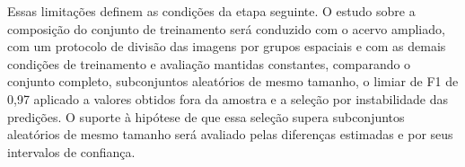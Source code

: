 Essas limita\c{c}\~oes definem as condi\c{c}\~oes da etapa seguinte. O estudo sobre a composi\c{c}\~ao do conjunto de treinamento ser\'a conduzido com o acervo ampliado, com um protocolo de divis\~ao das imagens por grupos espaciais e com as demais condi\c{c}\~oes de treinamento e avalia\c{c}\~ao mantidas constantes, comparando o conjunto completo, subconjuntos aleat\'orios de mesmo tamanho, o limiar de F1 de 0,97 aplicado a valores obtidos fora da amostra e a sele\c{c}\~ao por instabilidade das predi\c{c}\~oes. O suporte \`a hip\'otese de que essa sele\c{c}\~ao supera subconjuntos aleat\'orios de mesmo tamanho ser\'a avaliado pelas diferen\c{c}as estimadas e por seus intervalos de confian\c{c}a.
